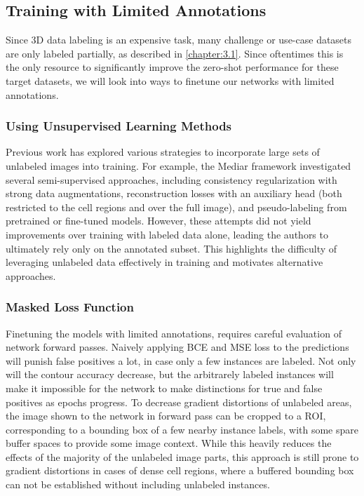 \subsection{Training with Limited Annotations}

Since 3D data labeling is an expensive task, many challenge or use-case datasets are only labeled partially, as described in \ref{chapter:3.1}. Since oftentimes this is the only resource to significantly improve the zero-shot performance for these target datasets, we will look into ways to finetune our networks with limited annotations. 

\subsubsection{Using Unsupervised Learning Methods}

Previous work has explored various strategies to incorporate large sets of unlabeled images into training. For example, the Mediar framework investigated several semi-supervised approaches, including consistency regularization with strong data augmentations, reconstruction losses with an auxiliary head (both restricted to the cell regions and over the full image), and pseudo-labeling from pretrained or fine-tuned models. However, these attempts did not yield improvements over training with labeled data alone, leading the authors to ultimately rely only on the annotated subset. This highlights the difficulty of leveraging unlabeled data effectively in training and motivates alternative approaches.

\subsubsection{Masked Loss Function}

Finetuning the models with limited annotations, requires careful evaluation of network forward passes. Naively applying BCE and MSE loss to the predictions will punish false positives a lot, in case only a few instances are labeled. Not only will the contour accuracy decrease, but the arbitrarely labeled instances will make it impossible for the network to make distinctions for true and false positives as epochs progress. To decrease gradient distortions of unlabeled areas, the image shown to the network in forward pass can be cropped to a ROI, corresponding to a bounding box of a few nearby instance labels, with some spare buffer spaces to provide some image context. While this heavily reduces the effects of the majority of the unlabeled image parts, this approach is still prone to gradient distortions in cases of dense cell regions, where a buffered bounding box can not be established without including unlabeled instances.


